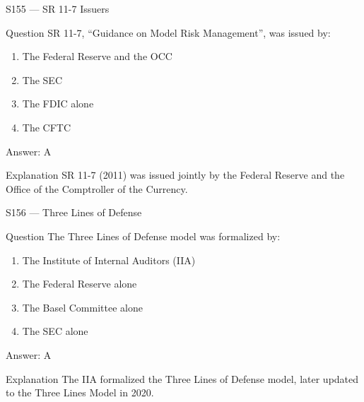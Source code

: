\documentclass[aspectratio=169,8pt]{beamer}
\begin{document}
	\begin{frame}{S155 --- SR 11-7 Issuers}
		\begin{block}{Question}
			SR 11-7, ``Guidance on Model Risk Management'', was issued by:
			\begin{enumerate}
				\item The Federal Reserve and the OCC
				\item The SEC
				\item The FDIC alone
				\item The CFTC
			\end{enumerate}
		\end{block}
		\begin{exampleblock}{Answer: A}\end{exampleblock}
		\begin{block}{Explanation}
			SR 11-7 (2011) was issued jointly by the Federal Reserve and the Office of the Comptroller of the Currency.
		\end{block}
	\end{frame}
	
	\begin{frame}{S156 --- Three Lines of Defense}
		\begin{block}{Question}
			The Three Lines of Defense model was formalized by:
			\begin{enumerate}
				\item The Institute of Internal Auditors (IIA)
				\item The Federal Reserve alone
				\item The Basel Committee alone
				\item The SEC alone
			\end{enumerate}
		\end{block}
		\begin{exampleblock}{Answer: A}\end{exampleblock}
		\begin{block}{Explanation}
			The IIA formalized the Three Lines of Defense model, later updated to the Three Lines Model in 2020.
		\end{block}
	\end{frame}
	
\end{document}
